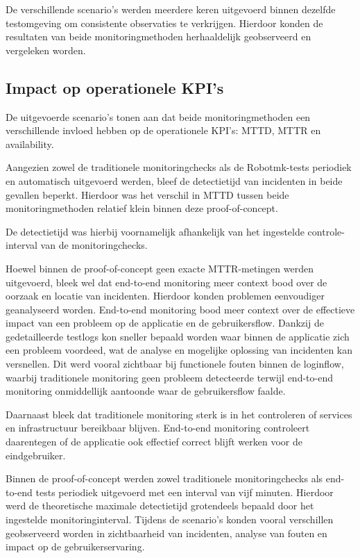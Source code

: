De verschillende scenario’s werden meerdere keren uitgevoerd binnen dezelfde testomgeving om consistente observaties te verkrijgen. Hierdoor konden de resultaten van beide monitoringmethoden herhaaldelijk geobserveerd en vergeleken worden.

\subsection{Impact op operationele KPI's}

De uitgevoerde scenario’s tonen aan dat beide monitoringmethoden een verschillende invloed hebben op de operationele KPI’s: MTTD, MTTR en availability.

Aangezien zowel de traditionele monitoringchecks als de Robotmk-tests periodiek en automatisch uitgevoerd werden, bleef de detectietijd van incidenten in beide gevallen beperkt. Hierdoor was het verschil in MTTD tussen beide monitoringmethoden relatief klein binnen deze proof-of-concept.

De detectietijd was hierbij voornamelijk afhankelijk van het ingestelde controle-interval van de monitoringchecks.

Hoewel binnen de proof-of-concept geen exacte MTTR-metingen werden uitgevoerd, bleek wel dat end-to-end monitoring meer context bood over de oorzaak en locatie van incidenten. Hierdoor konden problemen eenvoudiger geanalyseerd worden. End-to-end monitoring bood meer context over de effectieve impact van een probleem op de applicatie en de gebruikersflow. Dankzij de gedetailleerde testlogs kon sneller bepaald worden waar binnen de applicatie zich een probleem voordeed, wat de analyse en mogelijke oplossing van incidenten kan versnellen.
Dit werd vooral zichtbaar bij functionele fouten binnen de loginflow, waarbij traditionele monitoring geen probleem detecteerde terwijl end-to-end monitoring onmiddellijk aantoonde waar de gebruikersflow faalde.

Daarnaast bleek dat traditionele monitoring sterk is in het controleren of services en infrastructuur bereikbaar blijven. End-to-end monitoring controleert daarentegen of de applicatie ook effectief correct blijft werken voor de eindgebruiker.

Binnen de proof-of-concept werden zowel traditionele monitoringchecks als end-to-end tests periodiek uitgevoerd met een interval van vijf minuten. Hierdoor werd de theoretische maximale detectietijd grotendeels bepaald door het ingestelde monitoringinterval. Tijdens de scenario’s konden vooral verschillen geobserveerd worden in zichtbaarheid van incidenten, analyse van fouten en impact op de gebruikerservaring.


